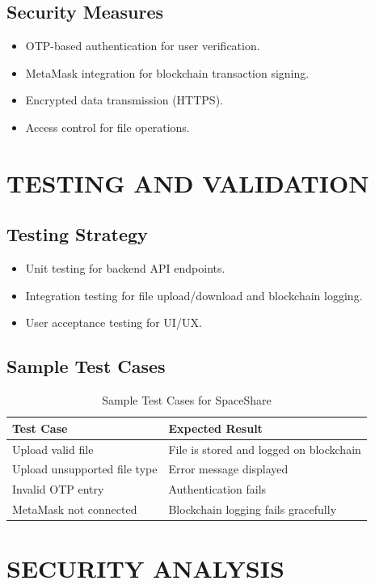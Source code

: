 \documentclass[a4paper, 12pt]{report}
\newenvironment{frontmatter}{}{}
\begin{document}
\begin{frontmatter}
\section{Security Measures}
\begin{itemize}
    \item OTP-based authentication for user verification.
    \item MetaMask integration for blockchain transaction signing.
    \item Encrypted data transmission (HTTPS).
    \item Access control for file operations.
\end{itemize}

\chapter{TESTING AND VALIDATION}
\section{Testing Strategy}
\begin{itemize}
    \item Unit testing for backend API endpoints.
    \item Integration testing for file upload/download and blockchain logging.
    \item User acceptance testing for UI/UX.
\end{itemize}

\section{Sample Test Cases}
\begin{longtable}{|p{}|p{}|}
\caption{Sample Test Cases for SpaceShare} \\
\hline
\textbf{Test Case} & \textbf{Expected Result} \\
\hline
Upload valid file & File is stored and logged on blockchain \\
\hline
Upload unsupported file type & Error message displayed \\
\hline
Invalid OTP entry & Authentication fails \\
\hline
MetaMask not connected & Blockchain logging fails gracefully \\
\hline
\end{longtable}

\chapter{SECURITY ANALYSIS}

\end{frontmatter}
\end{document}

